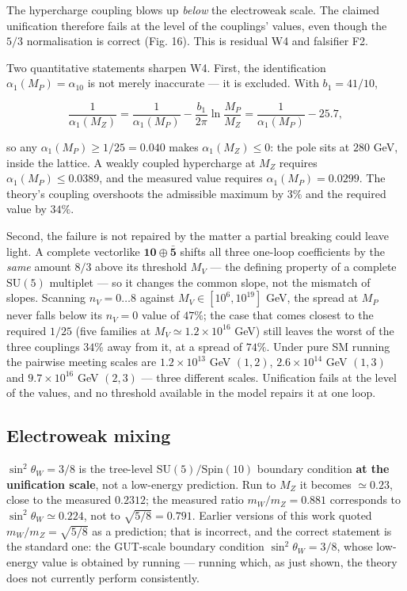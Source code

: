 \documentclass[aps,prd,amsmath,amssymb,superscriptaddress,longbibliography,floatfix,preprint]{revtex4-2}
\begin{document}
The hypercharge coupling blows up \emph{below} the electroweak scale. The claimed unification therefore fails at the level of the couplings' values, even though the $5/3$ normalisation is correct (Fig. 16). This is residual W4 and falsifier F2.

Two quantitative statements sharpen W4. First, the identification $\alpha_1(M_P) = \alpha_{10}$ is not merely inaccurate --- it is excluded. With $b_1 = 41/10$,

\[\frac{1}{\alpha_1(M_Z)} = \frac{1}{\alpha_1(M_P)} - \frac{b_1}{2\pi}\ln\frac{M_P}{M_Z} = \frac{1}{\alpha_1(M_P)} - 25.7,\]

so any $\alpha_1(M_P) \ge 1/25 = 0.040$ makes $\alpha_1(M_Z) \le 0$: the pole sits at $280$ GeV, inside the lattice. A weakly coupled hypercharge at $M_Z$ requires $\alpha_1(M_P) \le 0.0389$, and the measured value requires $\alpha_1(M_P) = 0.0299$. The theory's coupling overshoots the admissible maximum by $3\%$ and the required value by $34\%$.

Second, the failure is not repaired by the matter a partial breaking could leave light. A complete vectorlike $\mathbf{10}\oplus\bar{\mathbf{5}}$ shifts all three one-loop coefficients by the \emph{same} amount $8/3$ above its threshold $M_V$ --- the defining property of a complete $\mathrm{SU}(5)$ multiplet --- so it changes the common slope, not the mismatch of slopes. Scanning $n_V = 0\dots8$ against $M_V \in [10^6,\allowbreak{} 10^{19}]$ GeV, the spread at $M_P$ never falls below its $n_V = 0$ value of $47\%$; the case that comes closest to the required $1/25$ (five families at $M_V \simeq 1.2\times10^{16}$ GeV) still leaves the worst of the three couplings $34\%$ away from it, at a spread of $74\%$. Under pure SM running the pairwise meeting scales are $1.2\times10^{13}$ GeV $(1,\allowbreak{}2)$, $2.6\times10^{14}$ GeV $(1,\allowbreak{}3)$ and $9.7\times10^{16}$ GeV $(2,\allowbreak{}3)$ --- three different scales. Unification fails at the level of the values, and no threshold available in the model repairs it at one loop.

\subsection{Electroweak mixing}

$\sin^2\theta_W = 3/8$ is the tree-level $\mathrm{SU}(5)/\mathrm{Spin}(10)$ boundary condition \textbf{at the unification scale}, not a low-energy prediction. Run to $M_Z$ it becomes $\simeq 0.23$, close to the measured $0.2312$; the measured ratio $m_W/m_Z = 0.881$ corresponds to $\sin^2\theta_W \simeq 0.224$, not to $\sqrt{5/8} = 0.791$. Earlier versions of this work quoted $m_W/m_Z = \sqrt{5/8}$ as a prediction; that is incorrect, and the correct statement is the standard one: the GUT-scale boundary condition $\sin^2\theta_W = 3/8$, whose low-energy value is obtained by running --- running which, as just shown, the theory does not currently perform consistently.
\end{document}
